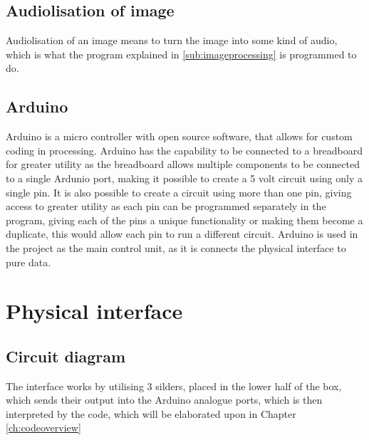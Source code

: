 	\subsection{Audiolisation of image}\label{sub:audiolisationofimage} 
	Audiolisation of an image means to turn the image into some kind of audio, which is what the program explained in \ref{sub:imageprocessing} is programmed to do. 
	
	\subsection{Arduino}\label{sub:arduino}
	Arduino is a micro controller with open source software, that allows for custom coding in processing. Arduino has the capability to be connected to a breadboard for greater utility as the breadboard allows multiple components to be connected to a single Ardunio port, making it possible to create a 5 volt circuit using only a single pin. It is also possible to create a circuit using more than one pin, giving access to greater utility as each pin can be programmed separately in the program, giving each of the pins a unique functionality or making them become a duplicate, this would allow each pin to run a different circuit.
	Arduino is used in the project as the main control unit, as it is connects the physical interface to pure data. 
	
\section{Physical interface}\label{sec:physicalinterface}

	
	\subsection{Circuit diagram}\label{sub:circuitdiagram}
	The interface works by utilising 3 silders, placed in the lower half of the box, which sends their output into the Arduino analogue ports, which is then interpreted by the code, which will be elaborated upon in Chapter \ref{ch:codeoverview} 